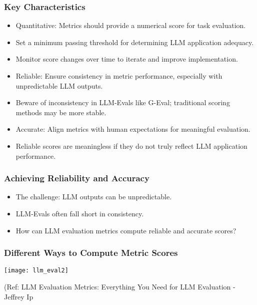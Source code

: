 \begin{frame}[fragile]\frametitle{Key Characteristics}
  \begin{itemize}
    \item Quantitative: Metrics should provide a numerical score for task evaluation.
    \item Set a minimum passing threshold for determining LLM application adequacy.
    \item Monitor score changes over time to iterate and improve implementation.
    \item Reliable: Ensure consistency in metric performance, especially with unpredictable LLM outputs.
    \item Beware of inconsistency in LLM-Evals like G-Eval; traditional scoring methods may be more stable.
    \item Accurate: Align metrics with human expectations for meaningful evaluation.
    \item Reliable scores are meaningless if they do not truly reflect LLM application performance.
  \end{itemize}
\end{frame}

\begin{frame}[fragile]\frametitle{Achieving Reliability and Accuracy}
  \begin{itemize}
    \item The challenge: LLM outputs can be unpredictable.
    \item LLM-Evals often fall short in consistency.
    \item How can LLM evaluation metrics compute reliable and accurate scores?
  \end{itemize}
\end{frame}


\begin{frame}[fragile]\frametitle{Different Ways to Compute Metric Scores}


\begin{center}
\texttt{[image: llm\_eval2]}
\end{center}		
		
{\tiny (Ref: LLM Evaluation Metrics: Everything You Need for LLM Evaluation - Jeffrey Ip}
			
			
\end{frame}


